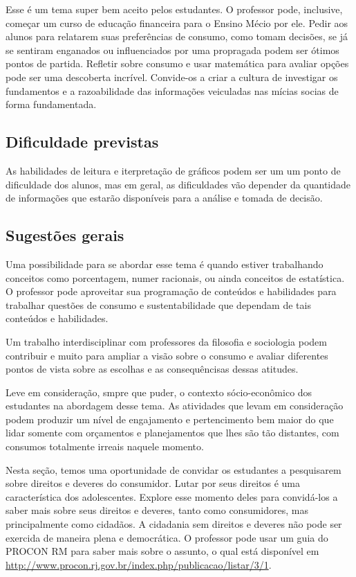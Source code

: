 \begin{paginatexto}
Esse é um tema super bem aceito pelos estudantes. O professor pode, inclusive, começar um curso de educação financeira para o Ensino Mécio por ele. Pedir aos alunos para relatarem suas preferências de consumo, como tomam decisões, se já se sentiram enganados ou influenciados por uma propragada podem ser ótimos pontos de partida. Refletir sobre consumo e usar matemática para avaliar opções pode ser uma descoberta incrível. Convide-os a criar a cultura de investigar os fundamentos e a razoabilidade das informações veiculadas nas mícias socias de forma fundamentada.

\subsection{Dificuldade previstas}
As habilidades de leitura e iterpretação de gráficos podem ser um um ponto de dificuldade dos alunos, mas em geral, as dificuldades vão depender da quantidade de informações que estarão disponíveis para a análise e tomada de decisão.

\subsection{Sugestões gerais}
Uma possibilidade para se abordar esse tema é quando estiver trabalhando conceitos como porcentagem, numer racionais, ou ainda conceitos de estatística. O professor pode aproveitar sua programação de conteúdos e habilidades para trabalhar questões de consumo e sustentabilidade que dependam de tais conteúdos e habilidades.

Um trabalho interdisciplinar com professores da filosofia e sociologia podem contribuir e muito para ampliar a visão sobre o consumo e avaliar diferentes pontos de vista sobre as escolhas e as consequêncisas dessas atitudes.

Leve em consideração, smpre que puder, o contexto sócio-econômico dos estudantes na abordagem desse tema. As atividades que levam em consideração podem produzir um nível de engajamento e pertencimento bem maior do que lidar somente com orçamentos e planejamentos que lhes são tão distantes, com consumos totalmente irreais naquele momento.

Nesta seção, temos uma oportunidade de convidar os estudantes a pesquisarem sobre direitos e deveres do consumidor. Lutar por seus direitos é uma característica dos adolescentes. Explore esse momento deles para convidá-los a saber mais sobre seus direitos e deveres, tanto como consumidores, mas principalmente como cidadãos. A cidadania sem direitos e deveres não pode ser exercida de maneira plena e democrática. O professor pode usar um guia do PROCON RM para saber mais sobre o assunto, o qual está disponível em \url{http://www.procon.rj.gov.br/index.php/publicacao/listar/3/1}.


\end{paginatexto}
